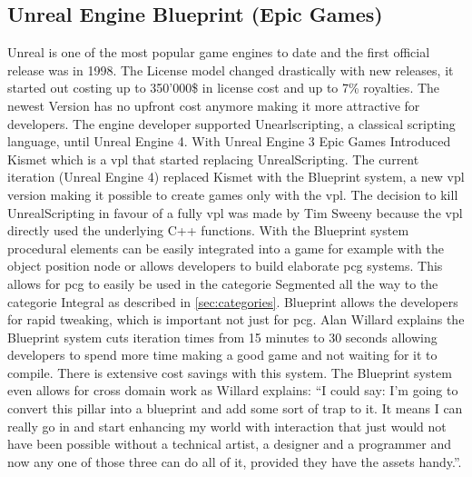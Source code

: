 \documentclass[10pt,a4paper]{article}
\begin{document}
\begin{multicols}{2}
\subsection{Unreal Engine Blueprint (Epic Games)}
Unreal is one of the most popular game engines to date and the first official release was in 1998. The License model changed drastically with new releases, it started out costing up to 350’000\$ in license cost and up to 7\% royalties\cite{Herz1999}. The newest Version has no upfront cost anymore making it more attractive for developers. The engine developer supported Unearlscripting, a classical scripting language, until Unreal Engine 4. With Unreal Engine 3 Epic Games Introduced Kismet which is a \gls{vpl} that started replacing UnrealScripting. The current iteration (Unreal Engine 4) replaced Kismet with the Blueprint system, a new \gls{vpl} version making it possible to create games only with the \gls{vpl}. The decision to kill UnrealScripting in favour of a fully \gls{vpl} was made by Tim Sweeny because the \gls{vpl} directly used the underlying C++ functions\cite{Wawro2017}. With the Blueprint system procedural elements can be easily integrated into a game for example with the object position node or allows developers to build elaborate \gls{pcg} systems. This allows for \gls{pcg} to easily be used in the categorie Segmented all the way to the categorie Integral as described in \autoref{sec:categories}. Blueprint allows the developers for rapid tweaking, which is important not just for \gls{pcg}. Alan Willard explains the Blueprint system cuts iteration times from 15 minutes to 30 seconds allowing developers to spend more time making a good game and not waiting for it to compile\cite{Totilo2012}. There is extensive cost savings with this system. The Blueprint system even allows for cross domain work as Willard explains: “I could say: I’m going to convert this pillar into a blueprint and add some sort of trap to it. It means I can really go in and start enhancing my world with interaction that just would not have been possible without a technical artist, a designer and a programmer and now any one of those three can do all of it, provided they have the assets handy.”\cite{Totilo2012}.

\end{multicols}
\end{document}
